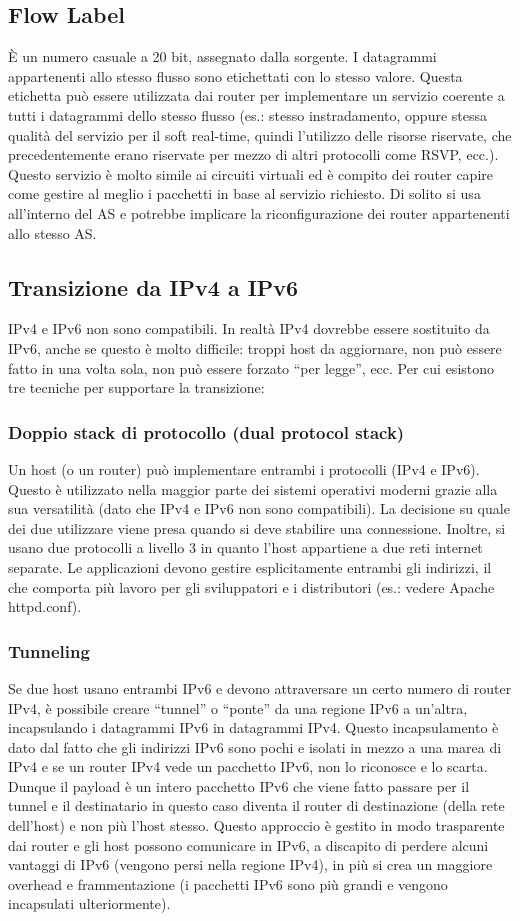 \subsection{Flow Label}
È un numero casuale a 20 bit, assegnato dalla sorgente. I datagrammi appartenenti allo stesso flusso sono etichettati con lo stesso valore. Questa etichetta può essere utilizzata dai router per implementare un servizio coerente a tutti i datagrammi dello stesso flusso (es.: stesso instradamento, oppure stessa qualità del servizio per il soft real-time, quindi l’utilizzo delle risorse riservate, che precedentemente erano riservate per mezzo di altri protocolli come RSVP, ecc.). Questo servizio è molto simile ai circuiti virtuali ed è compito dei router capire come gestire al meglio i pacchetti in base al servizio richiesto. Di solito si usa all’interno del AS e potrebbe implicare la riconfigurazione dei router appartenenti allo stesso AS.
\subsection{Transizione da IPv4 a IPv6}
IPv4 e IPv6 non sono compatibili. In realtà IPv4 dovrebbe essere sostituito da IPv6, anche se questo è molto difficile: troppi host da aggiornare, non può essere fatto in una volta sola, non può essere forzato “per legge”, ecc. Per cui esistono tre tecniche per supportare la transizione:
\subsubsection{Doppio stack di protocollo (dual protocol stack)}
Un host (o un router) può implementare entrambi i protocolli (IPv4 e IPv6). Questo è utilizzato nella maggior parte dei sistemi operativi moderni grazie alla sua versatilità (dato che IPv4 e IPv6 non sono compatibili). La decisione su quale dei due utilizzare viene presa quando si deve stabilire una connessione. Inoltre, si usano due protocolli a livello 3 in quanto l’host appartiene a due reti internet separate. Le applicazioni devono gestire esplicitamente entrambi gli indirizzi, il che comporta più lavoro per gli sviluppatori e i distributori (es.: vedere Apache httpd.conf).
\subsubsection{Tunneling}
Se due host usano entrambi IPv6 e devono attraversare un certo numero di router IPv4, è possibile creare “tunnel” o “ponte” da una regione IPv6 a un’altra, incapsulando i datagrammi IPv6 in datagrammi IPv4. Questo incapsulamento è dato dal fatto che gli indirizzi IPv6 sono pochi e isolati in mezzo a una marea di IPv4 e se un router IPv4 vede un pacchetto IPv6, non lo riconosce e lo scarta. Dunque il payload è un intero pacchetto IPv6 che viene fatto passare per il tunnel e il destinatario in questo caso diventa il router di destinazione (della rete dell’host) e non più l’host stesso. Questo approccio è gestito in modo trasparente dai router e gli host possono comunicare in IPv6, a discapito di perdere alcuni vantaggi di IPv6 (vengono persi nella regione IPv4), in più si crea un maggiore overhead e frammentazione (i pacchetti IPv6 sono più grandi e vengono incapsulati ulteriormente).
